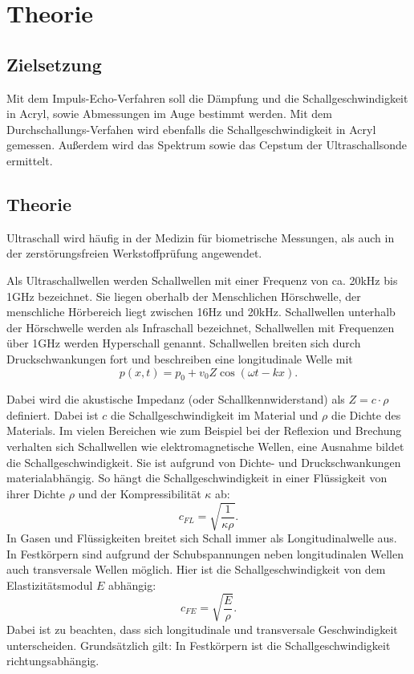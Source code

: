 \section{Theorie}
\label{sec:Theorie}


\subsection{Zielsetzung}
Mit dem Impuls-Echo-Verfahren soll die Dämpfung und die Schallgeschwindigkeit in
Acryl, sowie Abmessungen im Auge bestimmt werden. Mit dem Durchschallungs-Verfahen
wird ebenfalls die Schallgeschwindigkeit in Acryl gemessen.
Außerdem wird das Spektrum sowie das Cepstum der Ultraschallsonde ermittelt.


\subsection{Theorie}
Ultraschall wird häufig in der Medizin für biometrische Messungen, als auch in
der zerstörungsfreien Werkstoffprüfung angewendet.

Als Ultraschallwellen werden Schallwellen mit einer Frequenz von ca. 20\;kHz bis 1\;GHz
bezeichnet. Sie liegen oberhalb der Menschlichen Hörschwelle, der menschliche
Hörbereich liegt zwischen 16\;Hz und 20\;kHz. Schallwellen unterhalb der Hörschwelle werden
als Infraschall bezeichnet, Schallwellen mit Frequenzen über 1\;GHz werden
Hyperschall genannt.
Schallwellen breiten sich durch Druckschwankungen fort und beschreiben eine
longitudinale Welle mit
\begin{equation}
  p(x,t)= p_0 +v_0 Z\cos{(\omega t - k x)}.
  \label{longitud}
\end{equation}

Dabei wird die akustische Impedanz (oder Schallkennwiderstand) als $Z=c\cdot\rho$
definiert. Dabei ist $c$ die Schallgeschwindigkeit im Material und $\rho$
die Dichte des Materials. Im vielen Bereichen wie zum Beispiel bei der
Reflexion und Brechung verhalten sich Schallwellen wie elektromagnetische Wellen, eine
Ausnahme bildet die Schallgeschwindigkeit. Sie ist aufgrund von
Dichte- und Druckschwankungen materialabhängig. So hängt die Schallgeschwindigkeit
in einer Flüssigkeit von ihrer Dichte $\rho$ und der Kompressibilität $\kappa$
ab:
\begin{equation}
  c_{FL}=\sqrt{\frac{1}{\kappa \rho}}.
  \label{cfl}
\end{equation}
In Gasen und Flüssigkeiten breitet sich Schall immer als Longitudinalwelle aus.
In Festkörpern sind aufgrund der Schubspannungen neben longitudinalen Wellen auch
transversale Wellen möglich. Hier ist die Schallgeschwindigkeit von dem
Elastizitätsmodul $E$ abhängig:
\begin{equation}
  c_{FE}=\sqrt{\frac{E}{\rho}}.
  \label{cfest}
\end{equation}
Dabei ist zu beachten, dass sich longitudinale und transversale Geschwindigkeit
unterscheiden. Grundsätzlich gilt: In Festkörpern ist die Schallgeschwindigkeit
richtungsabhängig.

